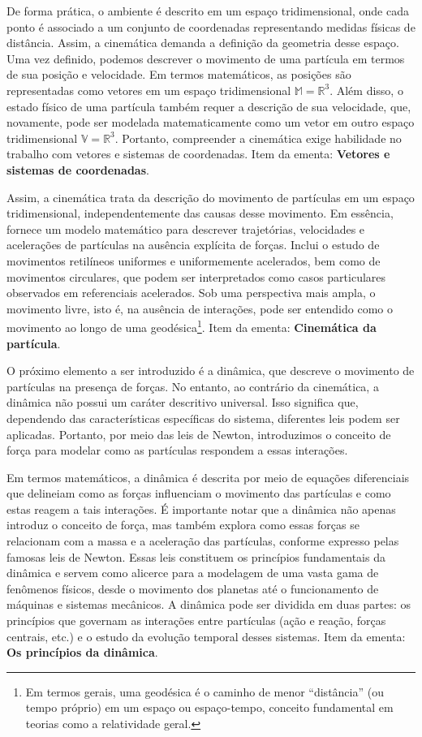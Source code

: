 \documentclass[a4paper, 12pt]{article}
\newcounter{mat}
\begin{document}
De forma prática, o ambiente é descrito em um espaço tridimensional, onde cada ponto é
associado a um conjunto de coordenadas representando medidas físicas de distância.
Assim, a cinemática demanda a definição da geometria desse espaço. Uma vez definido,
podemos descrever o movimento de uma partícula em termos de sua posição e velocidade.
Em termos matemáticos, as posições são representadas como vetores em um espaço
tridimensional $\mathbb{M} = \mathbb{R}^3$. Além disso, o estado físico de uma
partícula também requer a descrição de sua velocidade, que, novamente, pode ser
modelada matematicamente como um vetor em outro espaço tridimensional $\mathbb{V} =
    \mathbb{R}^3$. Portanto, compreender a cinemática exige habilidade no trabalho com
vetores e sistemas de coordenadas. Item da ementa: {\bf Vetores e sistemas de
coordenadas}.

Assim, a cinemática trata da descrição do movimento de partículas em um espaço
tridimensional, independentemente das causas desse movimento. Em essência, fornece um
modelo matemático para descrever trajetórias, velocidades e acelerações de partículas
na ausência explícita de forças. Inclui o estudo de movimentos retilíneos uniformes e
uniformemente acelerados, bem como de movimentos circulares, que podem ser
interpretados como casos particulares observados em referenciais acelerados. Sob uma
perspectiva mais ampla, o movimento livre, isto é, na ausência de interações, pode ser
entendido como o movimento ao longo de uma geodésica\footnote{Em termos gerais, uma
    geodésica é o caminho de menor ``distância'' (ou tempo próprio) em um espaço ou
    espaço-tempo, conceito fundamental em teorias como a relatividade geral.}.  Item da
ementa: {\bf Cinemática da partícula}.

O próximo elemento a ser introduzido é a dinâmica, que descreve o movimento de
partículas na presença de forças. No entanto, ao contrário da cinemática, a dinâmica
não possui um caráter descritivo universal. Isso significa que, dependendo das
características específicas do sistema, diferentes leis podem ser aplicadas. Portanto,
por meio das leis de Newton, introduzimos o conceito de força para modelar como as
partículas respondem a essas interações.

Em termos matemáticos, a dinâmica é descrita por meio de equações diferenciais que
delineiam como as forças influenciam o movimento das partículas e como estas reagem a
tais interações. É importante notar que a dinâmica não apenas introduz o conceito de
força, mas também explora como essas forças se relacionam com a massa e a aceleração
das partículas, conforme expresso pelas famosas leis de Newton. Essas leis constituem
os princípios fundamentais da dinâmica e servem como alicerce para a modelagem de uma
vasta gama de fenômenos físicos, desde o movimento dos planetas até o funcionamento de
máquinas e sistemas mecânicos. A dinâmica pode ser dividida em duas partes: os
princípios que governam as interações entre partículas (ação e reação, forças centrais,
etc.) e o estudo da evolução temporal desses sistemas. Item da ementa: {\bf Os
princípios da dinâmica}.
\end{document}
